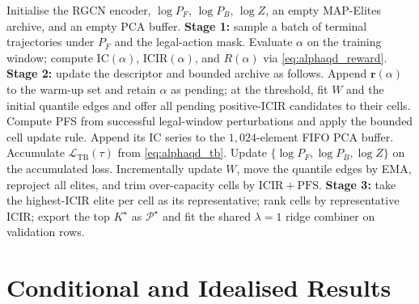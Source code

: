 \begin{algorithm}[!htb]
\caption{AlphaQD: three-stage training and export}
\label{alg:alphaqd}
\begin{algorithmic}[1]
\State Initialise the RGCN encoder, $\log P_F$, $\log P_B$, $\log Z$, an empty MAP-Elites archive, and an empty PCA buffer.
  \State \textbf{Stage 1:} sample a batch of terminal trajectories under $P_F$ and the legal-action mask.
    \State Evaluate $\alpha$ on the training window; compute $\mathrm{IC}(\alpha)$, $\mathrm{ICIR}(\alpha)$, and $R(\alpha)$ via \eqref{eq:alphaqd_reward}.
    \State \textbf{Stage 2:} update the descriptor and bounded archive as follows.
      \State Append $\mathbf{r}(\alpha)$ to the warm-up set and retain $\alpha$ as pending; at the threshold, fit $W$ and the initial quantile edges and offer all pending positive-ICIR candidates to their cells.
      \State Compute PFS from successful legal-window perturbations and apply the bounded cell update rule.
        \State Append its IC series to the $1{,}024$-element FIFO PCA buffer.
      \EndIf
    \EndIf
    \State Accumulate $\mathcal{L}_{\mathrm{TB}}(\tau)$ from \eqref{eq:alphaqd_tb}.
  \EndFor
  \State Update $\{\log P_F,\log P_B,\log Z\}$ on the accumulated loss.
    \State Incrementally update $W$, move the quantile edges by EMA, reproject all elites, and trim over-capacity cells by $\mathrm{ICIR}+\mathrm{PFS}$.
  \EndIf
\EndFor
\State \textbf{Stage 3:} take the highest-ICIR elite per cell as its representative; rank cells by representative ICIR; export the top $K^\star$ as $\mathcal{P}^\star$ and fit the shared $\lambda=1$ ridge combiner on validation rows.
\end{algorithmic}
\end{algorithm}

\section{Conditional and Idealised Results}
\label{sec:alphaqd_theory}

